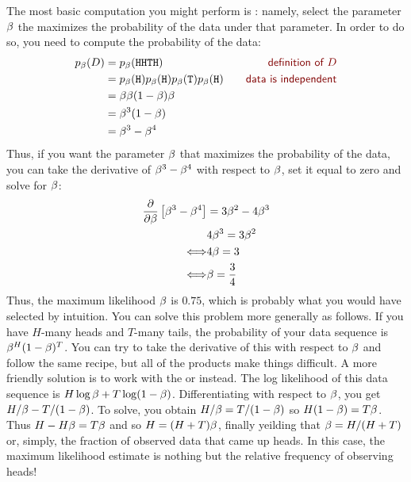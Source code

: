 The most basic computation you might perform is : namely, select the parameter $\beta$ the
maximizes the probability of the data under that parameter.  In order
to do so, you need to compute the probability of the data:
%
\begin{align} \label{eq:prob:binomial}
  p_\be(D)
  &= p_\be(\texttt{HHTH})
     \becauseof{definition of $D$} \\
  &= p_\be(\texttt{H})
     p_\be(\texttt{H})
     p_\be(\texttt{T})
     p_\be(\texttt{H})
      \becauseof{data is independent} \\
  &= \be \be (1-\be) \be \\
  &= \be^3 (1-\be) \\
  &= \be^3 - \be^4
\end{align}
%
Thus, if you want the parameter $\beta$ that maximizes the probability
of the data, you can take the derivative of $\beta^3-\beta^4$ with respect
to $\beta$, set it equal to zero and solve for $\beta$:
%
\begin{align}
  \frac {\partial} {\partial \beta} \left[ \beta^3 - \beta^4 \right] &= 3 \beta^2 -  4\beta^3\\
       & 4\beta^3 = 3\beta^2  \\
  \Longleftrightarrow & 4\beta = 3 \\
  \Longleftrightarrow & \beta  = \frac 3 4
\end{align}
%
Thus, the maximum likelihood $\beta$ is $0.75$, which is probably what
you would have selected by intuition.
%
You can solve this problem more generally as follows.  If you have
$H$-many heads and $T$-many tails, the probability of your data
sequence is $\beta^H (1-\beta)^T$.  You can try to take the derivative of
this with respect to $\beta$ and follow the same recipe, but all of the
products make things difficult.  A more friendly solution is to work
with the  or 
instead.  The log likelihood of this data sequence is $H \log \beta + T
\log (1-\beta)$.  Differentiating with respect to $\beta$, you get $H/\beta
- T/(1-\beta)$.  To solve, you obtain $H/\beta = T/(1-\beta)$ so $H (1-\beta)
= T \beta$.  Thus $H - H\beta = T\beta$ and so $H = (H+T) \beta$, finally
yeilding that $\beta = H/(H+T)$ or, simply, the fraction of observed
data that came up heads.  In this case, the maximum likelihood
estimate is nothing but the relative frequency of observing heads!


